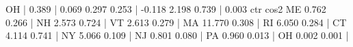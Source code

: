 \documentclass[
]{article}
\newenvironment{Shaded}{\begin{snugshade}}{\end{snugshade}}
\newcommand{\FloatTok}[1]{\textcolor[rgb]{0.00,0.00,0.81}{#1}}
\newcommand{\NormalTok}[1]{#1}
\newcommand{\SpecialCharTok}[1]{\textcolor[rgb]{0.00,0.00,0.00}{#1}}
\begin{document}
\begin{Shaded}
\begin{Highlighting}[]
\NormalTok{OH         }\SpecialCharTok{|}     \FloatTok{0.389} \SpecialCharTok{|}  \FloatTok{0.069}  \FloatTok{0.297}  \FloatTok{0.253} \SpecialCharTok{|} \SpecialCharTok{{-}}\FloatTok{0.118}  \FloatTok{2.198}  \FloatTok{0.739} \SpecialCharTok{|}  \FloatTok{0.003}
\NormalTok{              ctr   cos2  }
\NormalTok{ME          }\FloatTok{0.762}  \FloatTok{0.266} \SpecialCharTok{|}
\NormalTok{NH          }\FloatTok{2.573}  \FloatTok{0.724} \SpecialCharTok{|}
\NormalTok{VT          }\FloatTok{2.613}  \FloatTok{0.279} \SpecialCharTok{|}
\NormalTok{MA         }\FloatTok{11.770}  \FloatTok{0.308} \SpecialCharTok{|}
\NormalTok{RI          }\FloatTok{6.050}  \FloatTok{0.284} \SpecialCharTok{|}
\NormalTok{CT          }\FloatTok{4.114}  \FloatTok{0.741} \SpecialCharTok{|}
\NormalTok{NY          }\FloatTok{5.066}  \FloatTok{0.109} \SpecialCharTok{|}
\NormalTok{NJ          }\FloatTok{0.801}  \FloatTok{0.080} \SpecialCharTok{|}
\NormalTok{PA          }\FloatTok{0.960}  \FloatTok{0.013} \SpecialCharTok{|}
\NormalTok{OH          }\FloatTok{0.002}  \FloatTok{0.001} \SpecialCharTok{|}


\end{Highlighting}
\end{Shaded}
\end{document}

